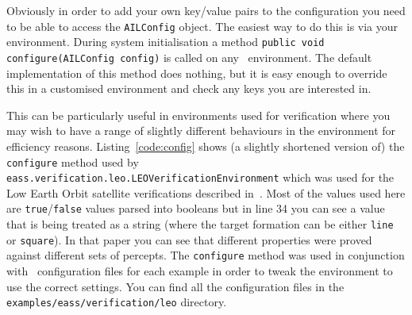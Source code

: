 Obviously in order to add your own key/value pairs to the configuration you need to be able to access the \texttt{AILConfig} object.  The easiest way to do this is via your environment.  During system initialisation a method \texttt{public void configure(AILConfig config)} is called on any \ail\ environment.  The default implementation of this method does nothing, but it is easy enough to override this in a customised environment and check any keys you are interested in.

\begin{sloppypar}
This can be particularly useful in environments used for verification where you may wish to have a range of slightly different behaviours in the environment for efficiency reasons.  Listing~\ref{code:config} shows (a slightly shortened version of) the \texttt{configure} method used by \texttt{eass.verification.leo.LEOVerificationEnvironment} which was used for the Low Earth Orbit satellite verifications described in~\cite{dennis14:_pract}.  Most of the values used here are \texttt{true}/\texttt{false} values parsed into booleans but in line 34 you can see a value that is being treated as a string (where the target formation can be either \texttt{line} or \texttt{square}).  In that paper you can see that different properties were proved against different sets of percepts.  The \texttt{configure} method was used in conjunction with \ail\ configuration files for each example in order to tweak the environment to use the correct settings.  You can find all the configuration files in the \texttt{examples/eass/verification/leo} directory.
\end{sloppypar}

